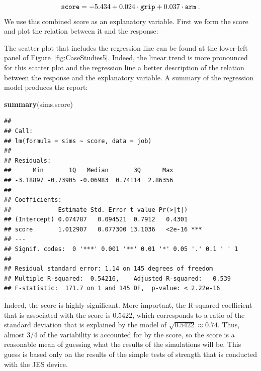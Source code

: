\documentclass[]{krantz}
\makeatletter
\newenvironment{Shaded}{\begin{snugshade}}{\end{snugshade}}
\newcommand{\KeywordTok}[1]{\textcolor[rgb]{0.13,0.29,0.53}{\textbf{#1}}}
\newcommand{\DataTypeTok}[1]{\textcolor[rgb]{0.13,0.29,0.53}{#1}}
\newcommand{\FloatTok}[1]{\textcolor[rgb]{0.00,0.00,0.81}{#1}}
\newcommand{\StringTok}[1]{\textcolor[rgb]{0.31,0.60,0.02}{#1}}
\newcommand{\OperatorTok}[1]{\textcolor[rgb]{0.81,0.36,0.00}{\textbf{#1}}}
\newcommand{\NormalTok}[1]{#1}
\newenvironment{kframe}{%
\medskip{}
\setlength{\fboxsep}{.8em}
 \def\at@end@of@kframe{}%
 \ifinner\ifhmode%
  \def\at@end@of@kframe{\end{minipage}}%
  \begin{minipage}{\columnwidth}%
 \fi\fi%
 \def\FrameCommand##1{\hskip\@totalleftmargin \hskip-\fboxsep
 \colorbox{shadecolor}{##1}\hskip-\fboxsep
     \hskip-\linewidth \hskip-\@totalleftmargin \hskip\columnwidth}%
 \MakeFramed {\advance\hsize-\width
   \@totalleftmargin\z@ \linewidth\hsize
   \@setminipage}}%
 {\par\unskip\endMakeFramed%
 \at@end@of@kframe}
\renewenvironment{Shaded}{\begin{kframe}}{\end{kframe}}
\theoremstyle{definition}
\theoremstyle{definition}
\theoremstyle{definition}
\theoremstyle{remark}
\makeatother
\begin{document}
\[\mbox{\texttt{score}} = -5.434 + 0.024\cdot \mbox{\texttt{grip}}+ 0.037\cdot \mbox{\texttt{arm}}\;.\]
We use this combined score as an explanatory variable. First we form the
score and plot the relation between it and the response:

\begin{Shaded}
\end{Shaded}

The scatter plot that includes the regression line can be found at the
lower-left panel of Figure~\ref{fig:CaseStudies5}. Indeed, the linear
trend is more pronounced for this scatter plot and the regression line a
better description of the relation between the response and the
explanatory variable. A summary of the regression model produces the
report:

\begin{Shaded}
\begin{Highlighting}[]
\KeywordTok{summary}\NormalTok{(sims.score)}
\end{Highlighting}
\end{Shaded}

\begin{verbatim}
## 
## Call:
## lm(formula = sims ~ score, data = job)
## 
## Residuals:
##      Min       1Q   Median       3Q      Max 
## -3.18897 -0.73905 -0.06983  0.74114  2.86356 
## 
## Coefficients:
##             Estimate Std. Error t value Pr(>|t|)    
## (Intercept) 0.074787   0.094521  0.7912   0.4301    
## score       1.012907   0.077300 13.1036   <2e-16 ***
## ---
## Signif. codes:  0 '***' 0.001 '**' 0.01 '*' 0.05 '.' 0.1 ' ' 1
## 
## Residual standard error: 1.14 on 145 degrees of freedom
## Multiple R-squared:  0.54216,    Adjusted R-squared:   0.539 
## F-statistic:  171.7 on 1 and 145 DF,  p-value: < 2.22e-16
\end{verbatim}

Indeed, the score is highly significant. More important, the R-squared
coefficient that is associated with the score is \(0.5422\), which
corresponds to a ratio of the standard deviation that is explained by
the model of \(\sqrt{0.5422} \approx 0.74\). Thus, almost 3/4 of the
variability is accounted for by the score, so the score is a reasonable
mean of guessing what the results of the simulations will be. This guess
is based only on the results of the simple tests of strength that is
conducted with the JES device.
\end{document}
